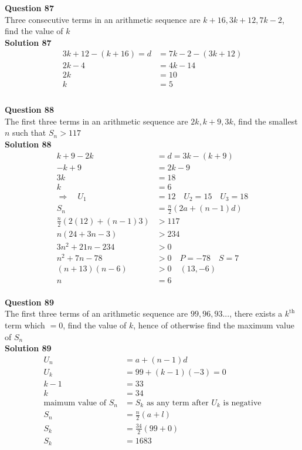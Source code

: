 \documentclass{article}
\begin{document}
\noindent\textbf{Question 87}\\[5pt]
Three consecutive terms in an arithmetic sequence are $k+16,3k+12,7k-2$, find the value of $k$\\[5pt]
\noindent\textbf{Solution 87}\\[5pt]
\begin{align*}
3k+12-(k+16)=d&=7k-2-(3k+12)\\[2pt]
2k-4&=4k-14\\[2pt]
2k&=10\\[2pt]
k&=5\\[-70pt]
\end{align*}\\[10pt]

\noindent\textbf{Question 88}\\[5pt]
The first three terms in an arithmetic sequence are $2k,k+9,3k$, find the smallest $n$ such that $S_n > 117$\\[5pt]
\noindent\textbf{Solution 88}\\[5pt]
\begin{align*}
k+9-2k&=d=3k-(k+9)\\[2pt]
-k+9&=2k-9\\[2pt]
3k&=18\\[2pt]
k&=6\\[12pt]
\Rightarrow\quad U_1&=12 \quad U_2=15 \quad U_3=18\\[2pt]
S_n&=\displaystyle\frac{n}{2}(2a+(n-1)d)\\[2pt]
\displaystyle\frac{n}{2}(2(12)+(n-1)3)&>117\\[2pt]
n(24+3n-3)&>234\\[2pt]
3n^2+21n-234&>0\\[2pt]
n^2+7n-78&>0\quad P=-78 \quad S=7\\[2pt]
(n+13)(n-6)&>0 \quad (13,-6)\\[2pt]
n&=6
\end{align*}\\[10pt]

\noindent\textbf{Question 89}\\[5pt]
The first three terms of an arithmetic sequence are $99,96,93...$, there exists a $k^{\text{th}}$ term which $=0$, find the value of $k$, hence of otherwise find the maximum value of $S_n$\\[5pt]
\noindent\textbf{Solution 89}\\[5pt]
\begin{align*}
U_n&=a+(n-1)d\\[2pt]
U_k&=99+(k-1)(-3)=0\\[2pt]
k-1&=33\\[2pt]
k&=34\\[12pt]
\text{maimum value of} \,\,S_n&=S_k\,\, \text{as any term after}\,\, U_k\,\, \text{is negative}\\[2pt]
S_n&=\displaystyle\frac{n}{2}(a+l)\\[2pt]
S_k&=\displaystyle\frac{34}{2}(99+0)\\[2pt]
S_k&=1683
\end{align*}\\[10pt]
\end{document}
